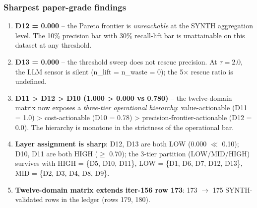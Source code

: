 \documentclass{article}
\begin{document}
\subsubsection{Sharpest paper-grade findings}
\begin{enumerate}
\item \textbf{D12 = 0.000} -- the Pareto frontier is \emph{unreachable}
at the SYNTH aggregation level. The 10\% precision bar with 30\%
recall-lift bar is unattainable on this dataset at any threshold.
\item \textbf{D13 = 0.000} -- the threshold sweep does not rescue
precision. At $\tau = 2.0$, the LLM sensor is silent
(n\_lift = n\_waste = 0); the 5$\times$ rescue ratio is undefined.
\item \textbf{D11 > D12 > D10 (1.000 > 0.000 vs 0.780)} -- the
twelve-domain matrix now exposes a \emph{three-tier operational
hierarchy}: value-actionable (D11 = 1.0) > cost-actionable
(D10 = 0.78) > precision-frontier-actionable (D12 = 0.0). The
hierarchy is monotone in the strictness of the operational bar.
\item \textbf{Layer assignment is sharp}: D12, D13 are both LOW
(0.000 $\ll$ 0.10); D10, D11 are both HIGH ($\geq$ 0.70); the
3-tier partition (LOW/MID/HIGH) survives with HIGH = \{D5, D10,
D11\}, LOW = \{D1, D6, D7, D12, D13\}, MID = \{D2, D3, D4, D8, D9\}.
\item \textbf{Twelve-domain matrix extends iter-156 row 173}: 173
$\to$ 175 SYNTH-validated rows in the ledger (rows 179, 180).
\end{enumerate}
\end{document}
